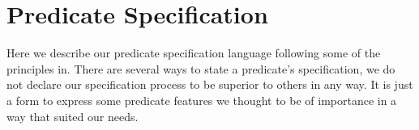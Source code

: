 
\section{Predicate Specification}
\label{sec:pred-spec}

Here we describe our predicate specification language following some of
the principles in.
%
There are several ways to state a predicate's specification, we do not
declare our specification process to be superior to others in any way.
%
It is just a form to express some predicate features we thought to be of
importance in a way that suited our needs.



